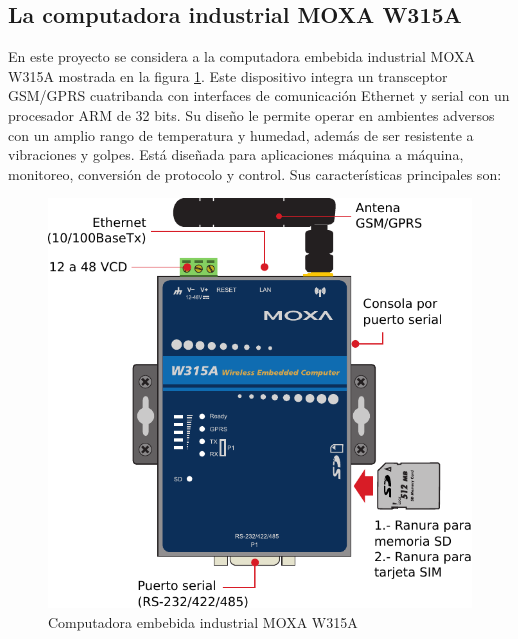 \subsection{La computadora industrial MOXA W315A}

En este proyecto se considera a la computadora embebida industrial MOXA W315A mostrada en la figura \ref{fig:moxa}. Este dispositivo integra un transceptor GSM/GPRS cuatribanda con interfaces de comunicación Ethernet y serial con un procesador ARM de 32 bits. Su diseño le permite operar en ambientes adversos con un amplio rango de temperatura y humedad, adem\'as de ser resistente a vibraciones y golpes. Está diseñada para aplicaciones máquina a máquina, monitoreo, conversión de protocolo y control. Sus características principales son: 

\begin{figure}
	\centering
	\includegraphics[scale=0.7]{capitulo_2_imgs/moxa.pdf}
	\caption{Computadora embebida industrial MOXA W315A}
	\label{fig:moxa}
\end{figure}


